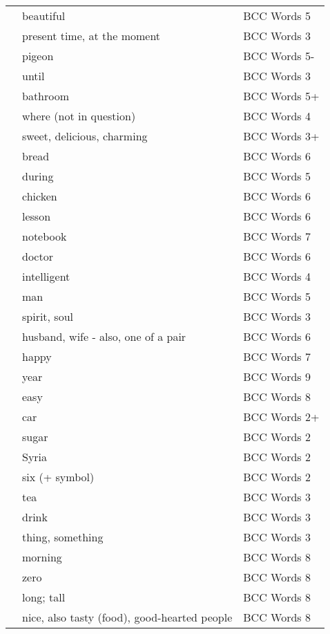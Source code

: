 \documentclass[10pt,twocolumn]{article}
\begin{document}
\begin{xtabular*}{\linewidth}{p{0.1\textwidth}p{0.2\textwidth}>{\footnotesize}p{0.2\textwidth}}
 & beautiful & BCC Words 5 \\
 & present time, at the moment & BCC Words 3 \\
 & pigeon & BCC Words 5- \\
 & until & BCC Words 3 \\
 & bathroom & BCC Words 5+ \\
 & where (not in question) & BCC Words 4 \\
 & sweet, delicious, charming & BCC Words 3+ \\
 & bread & BCC Words 6 \\
 & during & BCC Words 5 \\
 & chicken & BCC Words 6 \\
 & lesson & BCC Words 6 \\
 & notebook & BCC Words 7 \\
 & doctor & BCC Words 6 \\
 & intelligent & BCC Words 4 \\
 & man & BCC Words 5 \\
 & spirit, soul & BCC Words 3 \\
 & husband, wife - also, one of a pair & BCC Words 6 \\
 & happy & BCC Words 7 \\
 & year & BCC Words 9 \\
 & easy & BCC Words 8 \\
 & car & BCC Words 2+ \\
 & sugar & BCC Words 2 \\
 & Syria & BCC Words 2 \\
 & six (+ symbol) & BCC Words 2 \\
 & tea & BCC Words 3 \\
 & drink & BCC Words 3 \\
 & thing, something & BCC Words 3 \\
 & morning & BCC Words 8 \\
 & zero & BCC Words 8 \\
 & long; tall & BCC Words 8 \\
 & nice, also tasty (food), good-hearted people & BCC Words 8 \\

\end{xtabular*}
\end{document}

